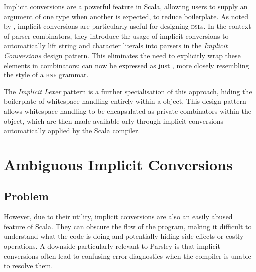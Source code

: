 \documentclass[../../main.tex]{subfiles}
\begin{document}

Implicit conversions are a powerful feature in Scala, allowing users to supply an argument of one type when another is expected, to reduce boilerplate.
As noted by \textcite{willis_design_2022}, implicit conversions are particularly useful for designing \textsc{dsl}s.
In the context of parser combinators, they introduce the usage of implicit conversions to automatically lift string and character literals into parsers in the \emph{Implicit Conversions} design pattern.
This eliminates the need to explicitly wrap these elements in combinators:
 can now be expressed as just , more closely resembling the style of a \textsc{bnf} grammar.

The \emph{Implicit Lexer} pattern is a further specialisation of this approach, hiding the boilerplate of whitespace handling entirely within a  object.
This design pattern allows whitespace handling to be encapsulated as private combinators within the  object, which are then made available only through implicit conversions automatically applied by the Scala compiler.


\section{Ambiguous Implicit Conversions}
\subsection*{Problem}
However, due to their utility, implicit conversions are also an easily abused feature of Scala.
They can obscure the flow of the program, making it difficult to understand what the code is doing and potentially hiding side effects or costly operations.
A downside particularly relevant to Parsley is that implicit conversions often lead to confusing error diagnostics when the compiler is unable to resolve them.
\end{document}
